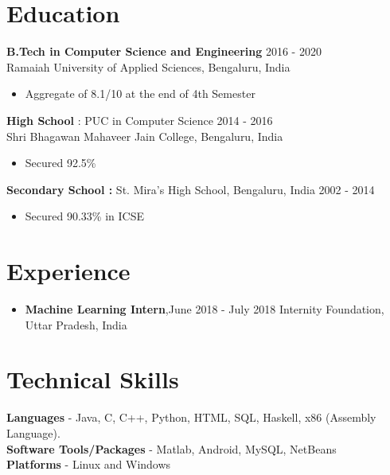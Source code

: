 \documentclass[margin, centered]{res}
\begin{document}
\begin{resume}

\section{Education}
\textbf{B.Tech in Computer Science and Engineering } \hfill 2016 - 2020 \\
\textnormal{Ramaiah University of Applied Sciences, Bengaluru, India}
\begin{itemize}
 \item Aggregate of 8.1/10 at the end of 4th Semester
\end{itemize}
\textbf{High School} : {PUC in Computer Science} \hfill 2014 - 2016 \\
\textnormal{Shri Bhagawan Mahaveer Jain College, Bengaluru, India}
\begin{itemize}
 \item Secured 92.5\%
\end{itemize}
\textbf{Secondary School :}\textnormal{ St. Mira's High School, Bengaluru, India} \hfill 2002 - 2014
\begin{itemize}
 \item Secured 90.33\% in ICSE
\end{itemize}
%
%
\section{Experience}
\begin{itemize}[leftmargin=*]
\item  \textbf{Machine Learning Intern},\hfill June 2018 - July 2018
\newline \textnormal{Internity Foundation, Uttar Pradesh, India}  
\end{itemize} 
%
%
\section{Technical \hspace{2mm} Skills}
\textbf{Languages} - Java, C, C++, Python, HTML, SQL, Haskell, x86 (Assembly Language). \\
\textbf{Software Tools/Packages} - Matlab, Android, MySQL, NetBeans\\
\textbf{Platforms} - Linux and Windows


\end{resume}
\end{document}
